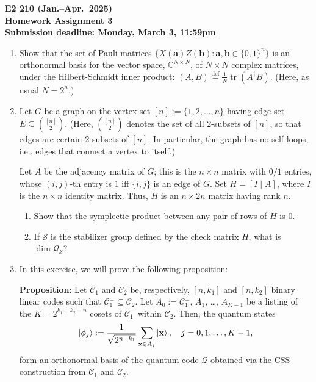 \documentclass[11pt,a4paper]{article}
\def\a{\mathbf{a}}
\def\b{\mathbf{b}}
\def\x{\mathbf{x}}
\def\C{{\mathbb C}}
\DeclareMathOperator{\tr}{tr}
\def\cC{\mathcal{C}}
\def\cQ{\mathcal{Q}}
\def\cS{\mathcal{S}}
\begin{document}
\begin{center}
{\Large \bf E2 210 (Jan.--Apr.\ 2025)} \\[6pt]

{\large\bf Homework Assignment 3} \\[6pt]

{\bf Submission deadline: Monday, March 3, 11:59pm}
\end{center}

\vspace{2ex}

\noindent
\begin{enumerate}
\item Show that the set of Pauli matrices $\bigl\{X(\a) Z(\b): \a, \b \in \{0,1\}^n\bigr\}$ is an orthonormal basis for the vector space, $\C^{N \times N}$, of $N \times N$ complex matrices, under the Hilbert-Schmidt inner product: $(A,B) \stackrel{\text{def}}{=} \frac{1}{N} \tr(A^\dag B)$. (Here, as usual $N = 2^n$.)

\item Let $G$ be a graph on the vertex set $[n] := \{1,2,\ldots,n\}$ having edge set $E \subseteq \binom{[n]}{2}$. (Here, $\binom{[n]}{2}$ denotes the set of all $2$-subsets of $[n]$, so that edges are certain $2$-subsets of $[n]$. In particular, the graph has no self-loops, i.e., edges that connect a vertex to itself.) 

Let $A$ be the adjacency matrix of $G$; this is the $n \times n$ matrix with $0/1$ entries, whose $(i,j)$-th entry is $1$ iff $\{i,j\}$ is an edge of $G$. Set $H = [I \mid A]$, where $I$ is the $n \times n$ identity matrix. Thus, $H$ is an $n \times 2n$ matrix having rank $n$.
\begin{enumerate}
\item Show that the symplectic product between any pair of rows of $H$ is $0$. 
\item If $\cS$ is the stabilizer group defined by the check matrix $H$, what is $\dim \cQ_{\cS}$?
\end{enumerate}

\item In this exercise, we will prove the following proposition:

\textbf{Proposition}: Let $\cC_1$ and $\cC_2$ be, respectively, $[n,k_1]$ and $[n,k_2]$ binary linear codes such that $\cC_1^{\perp} \subseteq \cC_2$. Let $A_0 := \cC_1^{\perp}$, $A_1$, \ldots, $A_{K-1}$ be a listing of the $K = 2^{k_1+k_2-n}$ cosets of $\cC_1^{\perp}$ within $\cC_2$. Then, the quantum states 
$$
\ket{\phi_j} := \frac{1}{\sqrt{2^{n-k_1}}} \sum_{\x \in A_j} \ket{\x}, \ \ \ j = 0,1,\ldots,K-1,
$$
form an orthonormal basis of the quantum code $\mathcal{Q}$ obtained via the CSS construction from $\cC_1$ and $\cC_2$.


\end{enumerate}
\end{document}
